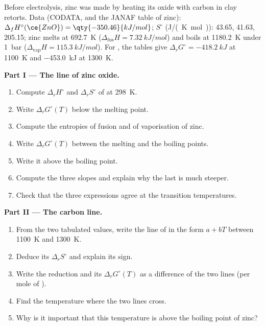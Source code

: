 \begin{problem}
\label{pb:b2:ellingham:1}
Before electrolysis, zinc was made by heating its oxide with carbon in clay
retorts. Data (CODATA, and the JANAF table of zinc): $\Delta_f H^\circ(\ce{ZnO})
= \qty{-350.46}{kJ/mol}$; $S^\circ$ (\unit{J/(K.mol)}):  43.65, 
41.63,  205.15; zinc melts at \qty{692.7}{K} ($\Delta_{\text{fus}}H =
\qty{7.32}{kJ/mol}$) and boils at \qty{1180.2}{K} under \qty{1}{bar}
($\Delta_{\text{vap}}H = \qty{115.3}{kJ/mol}$). For , the
tables give $\Delta_r G^\circ = \qty{-418.2}{kJ}$ at \qty{1100}{K} and
\qty{-453.0}{kJ} at \qty{1300}{K}.

\medskip
\noindent\textbf{Part I --- The line of zinc oxide.}
\begin{enumerate}
  \item Compute $\Delta_r H^\circ$ and $\Delta_r S^\circ$ of  at \qty{298}{K}.
  \item Write $\Delta_r G^\circ(T)$ below the melting point.
  \item Compute the entropies of fusion and of vaporisation of zinc.
  \item Write $\Delta_r G^\circ(T)$ between the melting and the boiling points.
  \item Write it above the boiling point.
  \item Compute the three slopes and explain why the last is much steeper.
  \item Check that the three expressions agree at the transition temperatures.
\end{enumerate}

\medskip
\noindent\textbf{Part II --- The carbon line.}
\begin{enumerate}[resume]
  \item From the two tabulated values, write the line of  in
        the form $a + bT$ between \qty{1100}{K} and \qty{1300}{K}.
  \item Deduce its $\Delta_r S^\circ$ and explain its sign.
  \item Write the reduction  and its $\Delta_r
        G^\circ(T)$ as a difference of the two lines (per mole of ).
  \item Find the temperature where the two lines cross.
  \item Why is it important that this temperature is above the boiling point
        of zinc?
\end{enumerate}


\end{problem}
